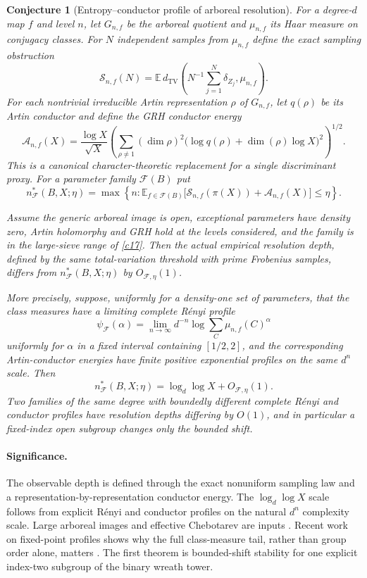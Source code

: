 \documentclass[11pt]{article}
\newtheorem{conjecture}{Conjecture}
\newcommand{\E}{\mathbb E}
\begin{document}
\begin{conjecture}[Entropy--conductor profile of arboreal resolution]\label{c16}
For a degree-$d$ map $f$ and level $n$, let $G_{n,f}$ be the arboreal quotient and
$\mu_{n,f}$ its Haar measure on conjugacy classes.  For $N$ independent samples from
$\mu_{n,f}$ define the exact sampling obstruction
\[
 \mathcal S_{n,f}(N)=
 \E\,d_{\mathrm{TV}}\!\left(N^{-1}\sum_{j=1}^N\delta_{Z_j},\mu_{n,f}\right).
\]
For each nontrivial irreducible Artin representation $\rho$ of $G_{n,f}$, let
$q(\rho)$ be its Artin conductor and define the GRH conductor energy
\[
 \mathcal A_{n,f}(X)=
 \frac{\log X}{\sqrt X}
 \left(\sum_{\rho\ne1}(\dim\rho)^2
  \bigl(\log q(\rho)+\dim(\rho)\log X\bigr)^2\right)^{1/2}.
\]
This is a canonical character-theoretic replacement for a single discriminant proxy.
For a parameter family $\mathcal F(B)$ put
\[
 n^*_{\mathcal F}(B,X;\eta)=
 \max\left\{n:\E_{f\in\mathcal F(B)}
   \bigl[\mathcal S_{n,f}(\pi(X))+\mathcal A_{n,f}(X)\bigr]\le\eta\right\}.
\]

Assume the generic arboreal image is open, exceptional parameters have density zero,
Artin holomorphy and GRH hold at the levels considered, and the family is in the
large-sieve range of \cref{c17}.  Then the actual empirical resolution depth, defined by
the same total-variation threshold with prime Frobenius samples, differs from
$n^*_{\mathcal F}(B,X;\eta)$ by $O_{\mathcal F,\eta}(1)$.

More precisely, suppose, uniformly for a density-one set of parameters, that the class
measures have a limiting complete R\'enyi profile
\[
 \psi_{\mathcal F}(\alpha)=
 \lim_{n\to\infty}d^{-n}\log\sum_C\mu_{n,f}(C)^\alpha
\]
uniformly for $\alpha$ in a fixed interval containing $[1/2,2]$, and the corresponding
Artin-conductor energies have finite positive exponential profiles on the same
$d^n$ scale.  Then
\[
 n^*_{\mathcal F}(B,X;\eta)=\log_d\log X+O_{\mathcal F,\eta}(1).
\]
Two families of the same degree with boundedly different complete R\'enyi and conductor
profiles have resolution depths differing by $O(1)$, and in particular a fixed-index open
subgroup changes only the bounded shift.
\end{conjecture}

\paragraph{Significance.}
The observable depth is defined through the exact nonuniform sampling law and a
representation-by-representation conductor energy.  The $\log_d\log X$ scale
follows from explicit R\'enyi and conductor profiles on
the natural $d^n$ complexity scale.  Large arboreal images and effective Chebotarev are
inputs \cite{JonesSurvey,Kadets,ThornerZaman}.  Recent work on fixed-point profiles shows
why the full class-measure tail, rather than group order alone, matters
\cite{Farina}.  The first theorem is bounded-shift stability for one explicit index-two
subgroup of the binary wreath tower.
\end{document}
